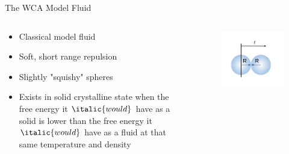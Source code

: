 \documentclass{beamer}
\begin{document}
\begin{frame}{The WCA Model Fluid}
\begin{columns}[t]
		\begin{block}{}
			\begin{itemize}
			    \item Classical model fluid
				\item Soft, short range repulsion
                \item Slightly "squishy" spheres
				\item Exists in solid crystalline state when the free 
				energy it $\italic{would}$ have as a  solid is lower than the free 
				energy it $\italic{would}$ have as a fluid at that same temperature and density
			\end{itemize}
		\end{block}		
		\vspace{-3em}
          \begin{figure}
             \centering
             \includegraphics[width=1.1\columnwidth]{figs/TwoSpheresandplot.pdf} 
          \end{figure} 	 
	\end{columns}	
\end{frame}
\end{document}
